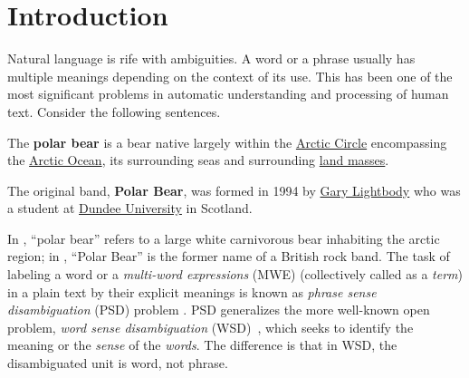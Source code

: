 \section{Introduction}
\label{intro}
Natural language is rife with ambiguities. A word or a phrase usually has
multiple meanings depending on the context of its use.
This has been one of the most
significant problems in automatic understanding and processing of human
text.
Consider the following sentences.
\myskip
\begin{example}
\label{ex-bear1}
The \textbf{polar bear} is a bear native largely within the \uline{Arctic Circle}
encompassing the \uline{Arctic Ocean}, its surrounding seas and surrounding \uline{land masses}.
\end{example}
\begin{example}
\label{ex-bear2}
The original band, \textbf{Polar Bear}, was formed in 1994 by
\uline{Gary Lightbody} who was a student at \uline{Dundee University} in Scotland.
\end{example}

In , ``polar bear'' refers to a large white carnivorous
bear inhabiting the arctic region; in , ``Polar Bear'' is
the former name of a British rock band. The task of labeling
a word or a {\em multi-word expressions} (MWE) (collectively called
as a {\em term}) in a plain text by their explicit meanings
is known as {\em phrase sense disambiguation}
(PSD) problem \cite{carpuat2007phrase}.
PSD generalizes the more well-known open problem,
{\em word sense disambiguation} (WSD)~\cite{navigli09:wsd}, which seeks
to identify the meaning or the {\em sense} of the {\em words}.
The difference is that in WSD, the disambiguated unit is word, not phrase.

